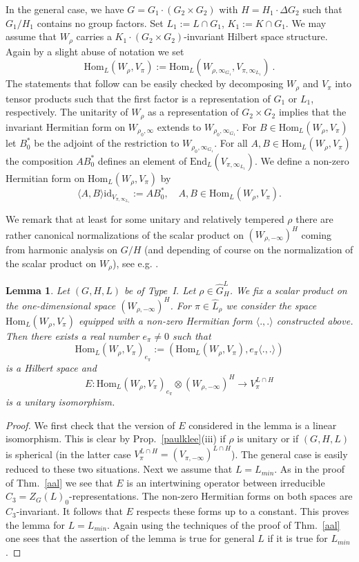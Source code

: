 \documentclass[10]{amsart}
\newtheorem{lem}[thm]{Lemma}
\theoremstyle{remark}
\theoremstyle{definition}
\numberwithin{equation}{section}
\newcommand{\End}{\text{End}}
\newcommand{\Hom}{\mathrm{Hom}}
\newcommand{\id}{\mathrm{id}}
\begin{document}
{In the general case, we have $G=G_1\cdot(G_2\times G_2)$ with $H=H_1\cdot\Delta G_2$ such that $G_1/H_1$ contains no group factors. Set $L_1:=L\cap G_1$, $K_1:=K\cap G_1$.
We may assume that $W_\rho$ carries a $K_1\cdot(G_2\times G_2)$-invariant Hilbert space structure. Again by a slight abuse of notation we set
$$ \Hom_L(W_\rho, V_\pi):=\Hom_L(W_{\rho,\infty_{G_1}}, V_{\pi,\infty_{L_1}})\ .$$
The statements that follow can be easily checked by decomposing $W_\rho$ and $V_\pi$ into tensor products such that the first factor is a representation of $G_1$ or $L_1$, respectively.
The unitarity of $W_\rho$ as a representation of  $G_2\times G_2$ implies that the invariant Hermitian form on $W_{\rho_0,\infty}$ extends to $W_{\rho_0,\infty_{G_1}}$.
For $B\in\Hom_L(W_\rho, V_\pi)$ let $B_0^*$ be the adjoint of the restriction to $W_{\rho_0,\infty_{G_1}}$. For all $A,B\in \Hom_L(W_\rho, V_\pi)$ the composition $AB_0^*$ defines an element of $\End_L(V_{\pi,\infty_{L_1}})$. We define a non-zero Hermitian form on $\Hom_L(W_\rho, V_\pi)$ by 
$$ \langle A, B\rangle \id_{V_{\pi,\infty_{L_1}}}:=AB_0^*,\quad A,B\in \Hom_L(W_{\rho},V_{\pi}).$$

We remark that at least for some unitary and relatively tempered $\rho$ there are rather canonical normalizations of the scalar product on $(W_{\rho,-\infty})^H$ coming from harmonic analysis on $G/H$ (and depending of course on the normalization of the scalar product on $W_\rho$), see e.g. \cite{vdBFJS}.

\begin{lem}\label{huckepack}
Let $(G,H,L)$ be of Type~I. Let $\rho\in\widehat G^L _H$. We fix a scalar product on the one-dimensional space $(W_{\rho,-\infty})^H$. For $\pi\in\widehat L_\rho$ we consider the space $\Hom_L(W_{\rho},V_{\pi})$ equipped with a non-zero Hermitian form $\langle.,.\rangle$ constructed above.
Then there exists a real number $e_\pi\ne0$ such that
$$  \Hom_L(W_{\rho},V_{\pi})_{e_\pi}:= \left ( \Hom_L(W_{\rho},V_{\pi}),e_\pi\langle.,.\rangle\right )$$
is a Hilbert space and
$$ E: \Hom_L(W_{\rho},V_{\pi})_{e_\pi}\otimes (W_{\rho,-\infty})^H\longrightarrow  V_{\pi}^{L\cap H} $$
is a unitary isomorphism.
\end{lem}

\begin{proof}
We first check that the version of $E$ considered in the lemma is a linear isomorphism. This is clear by Prop.~\ref{paulklee}(iii) if $\rho$ is unitary or if $(G,H,L)$
is spherical (in the latter case $V_\pi^{L\cap H}=(V_{\pi,-\infty})^{L\cap H}$). The general case is easily reduced to these two situations. 
Next we assume that $L=L_{min}$. As in the proof of Thm.~\ref{aal} we see that $E$ is an intertwining operator between irreducible $C_3=Z_G(L)_0$-representations.
The non-zero Hermitian forms on both spaces are $C_3$-invariant. It follows that $E$ respects these forms up to a constant. This proves the lemma for $L=L_{min}$. Again using the techniques of the proof
of Thm.~\ref{aal} one sees that the assertion of the lemma is true for general $L$ if it is true for $L_{min}$.
\end{proof}

}
\end{document}
